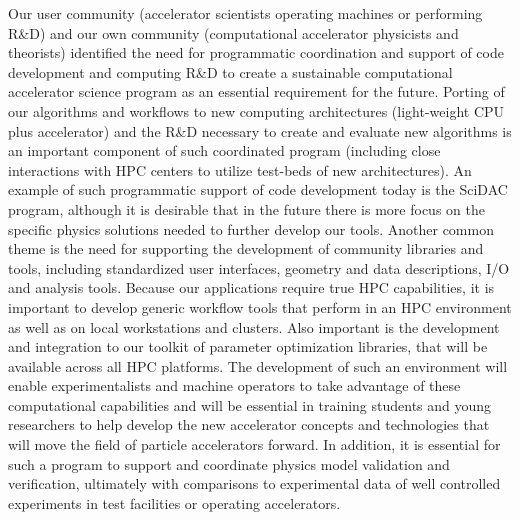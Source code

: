 Our user community (accelerator scientists operating machines or performing R\&D) and our own community (computational accelerator physicists and theorists) identified the need for programmatic coordination and support of code development and computing R\&D to create a sustainable
computational accelerator science program as an essential requirement for the future.   Porting of our
algorithms and workflows to new computing architectures
(light-weight CPU plus accelerator) and the R\&D necessary to
create and evaluate new algorithms is an important component of
such coordinated program (including close interactions with HPC
centers to utilize test-beds of new architectures). An example of
such programmatic support of code development today is the SciDAC program, although
it is desirable that in the future there is more focus on the
specific physics solutions needed to further develop our tools.  Another
common theme is the need for supporting the development of
community libraries and tools, including standardized user
interfaces, geometry and data descriptions, I/O and analysis tools.
Because our applications require true HPC capabilities,
it is important to develop generic workflow tools that perform in an HPC
environment as well as on local workstations and clusters. Also
important is the development and
integration to our toolkit of parameter optimization libraries,
that will be available across all HPC platforms.  The development
of such an environment will enable experimentalists and machine
operators to take advantage of these computational capabilities
and will be essential in training students and young researchers
to help develop the new accelerator concepts and technologies
that will move the field of particle accelerators forward.   In
addition, it is essential for such a program to support and
coordinate physics model validation and verification, ultimately
with comparisons to experimental data of well controlled
experiments in test facilities or operating accelerators.

